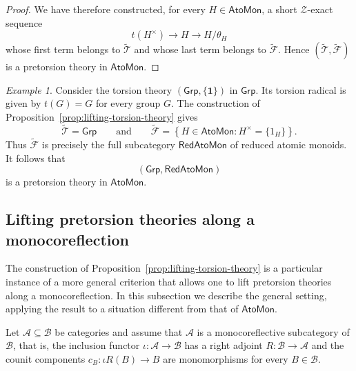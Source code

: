 \documentclass[a4paper,10pt,reqno]{amsart}
\theoremstyle{definition}
\theoremstyle{remark}
\newtheorem{example}[theorem]{Example}
\newcommand{\AtoMon}{\mathsf{AtoMon}}
\newcommand{\RedAtoMon}{\mathsf{RedAtoMon}}
\newcommand{\Grp}{\mathsf{Grp}}
\newcommand{\Cal}[1]{\mathcal{#1}}
\begin{document}
\begin{proof}
We have therefore constructed, for every $H\in\AtoMon$, a short $\Cal Z$-exact sequence
$$
t(H^\times)
\to
H
\to
H/\theta_H
$$
whose first term belongs to $\widetilde{\mathcal T}$ and whose last term belongs to $\widetilde{\mathcal F}$. Hence
$(\widetilde{\mathcal T},\widetilde{\mathcal F})$ is a pretorsion theory in $\AtoMon$.
\end{proof}

\begin{example}\label{ex:groups-reduced-pretorsion}
Consider the torsion theory $(\Grp,\{\mathbf 1\})$ in $\Grp$. Its torsion radical is given by $t(G)=G$ for every group $G$. The construction of Proposition~\ref{prop:lifting-torsion-theory} gives
$$
\widetilde{\mathcal T}=\Grp \qquad \text{and} \qquad
\widetilde{\mathcal F}
=
\left\{
H\in\AtoMon:H^\times=\{1_H\}
\right\}.
$$
Thus $\widetilde{\mathcal F}$ is precisely the full subcategory $\RedAtoMon$ of reduced atomic monoids. It follows that
$$
(\Grp,\RedAtoMon)
$$
is a pretorsion theory in $\AtoMon$.
\end{example}


\subsection{Lifting pretorsion theories along a monocoreflection}\label{subsec:pretorsion_general}
The construction of Proposition~\ref{prop:lifting-torsion-theory} is a particular instance of a more general criterion that allows one to lift pretorsion theories along a monocoreflection. In this subsection we describe the general setting, applying the result to a situation different from that of $\AtoMon$.

\medskip

Let $\Cal A\subseteq\Cal B$ be categories and assume that $\Cal A$ is a monocoreflective subcategory of $\Cal B$, that is, the inclusion functor
$
\iota\colon\Cal A\to\Cal B
$
has a right adjoint
$
R\colon\Cal B\to\Cal A
$
and the counit components
$
c_B\colon\iota R(B)\to B
$
are monomorphisms for every $B\in\Cal B$.
\end{document}
